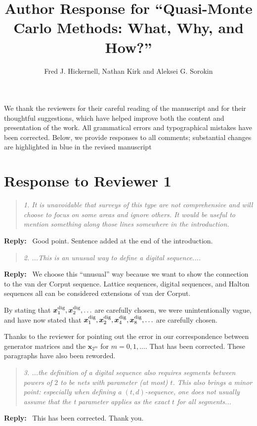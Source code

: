 \documentclass[11pt]{article}
\title{Author Response for “Quasi-Monte Carlo Methods: What, Why, and How?”}
\author{Fred J. Hickernell, Nathan Kirk and Aleksei G. Sorokin}
\date{}
\newenvironment{response}{%
  \vspace{1em}
  \begin{quote}\itshape
}{%
  \end{quote}
  \noindent\textbf{Reply:}~
}
\begin{document}
\maketitle

We thank the reviewers for their careful reading of the manuscript and for their thoughtful suggestions, which have helped improve both the content and presentation of the work. All grammatical errors and typographical mistakes have been corrected. Below, we provide responses to all comments; substantial changes are highlighted in blue in the revised manuscript

\section*{Response to Reviewer 1}

\begin{response}{1.}
It is unavoidable that surveys of this type are not comprehensive and will choose to focus
on some areas and ignore others. It would be useful to mention something along those lines
somewhere in the introduction.
\end{response}
Good point. Sentence added at the end of the introduction.

\begin{response}{2.}
...This is an unusual way to define a digital
sequence....
\end{response}
We choose this ``unusual'' way because we want to show the connection to the van der Corput sequence.  Lattice sequences, digital sequences, and Halton sequences all can be considered extensions of van der Corput.

By stating that ${\boldsymbol{x}}^{\text{dig}}_1, {\boldsymbol{x}}^{\text{dig}}_2, \ldots$ are carefully chosen, we were unintentionally vague, and have now stated that ${\boldsymbol{x}}^{\text{dig}}_1, {\boldsymbol{x}}^{\text{dig}}_2, {\boldsymbol{x}}^{\text{dig}}_4, {\boldsymbol{x}}^{\text{dig}}_8, \ldots$ are carefully chosen.

Thanks to the reviewer for pointing out the error in our correspondence between generator matrices and the $\boldsymbol{x}_{2^m}$ for $m =  0, 1, \ldots$.  That has been corrected.  These paragraphs have also been reworded.


\begin{response}{3.}
...the definition of a digital sequence also requires segments between powers of $2$ to be nets with parameter (at most) $t$. This also brings a minor point: especially when defining a $(t, d)$-sequence, one does not usually assume that the t parameter applies as the exact $t$ for all segments...
\end{response}
This has been corrected.  Thank you.
\end{document}
